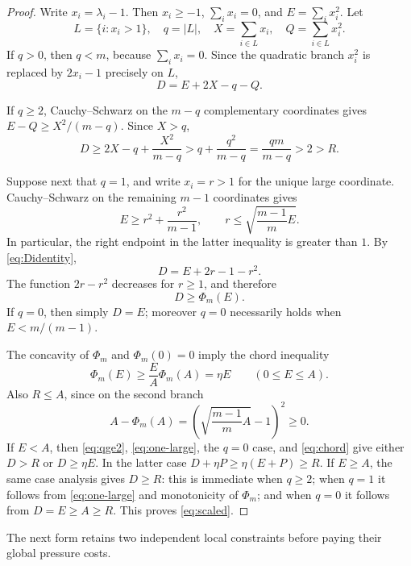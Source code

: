 \documentclass[11pt]{amsart}
\theoremstyle{remark}
\begin{document}
\begin{proof}
Write $x_i=\lambda_i-1$.  Then $x_i\ge-1$, $\sum_i x_i=0$, and
$E=\sum_i x_i^2$.  Let
\[
 L=\{i:x_i>1\},\quad q=|L|,
 \quad X=\sum_{i\in L}x_i,
 \quad Q=\sum_{i\in L}x_i^2.
\]
If $q>0$, then $q<m$, because $\sum_i x_i=0$.
Since the quadratic branch $x_i^2$ is replaced by $2x_i-1$ precisely on
$L$,
\begin{equation}\label{eq:Didentity}
 D=E+2X-q-Q.
\end{equation}

If $q\ge2$, Cauchy--Schwarz on the $m-q$ complementary coordinates gives
$E-Q\ge X^2/(m-q)$.  Since $X>q$,
\begin{equation}\label{eq:qge2}
 D\ge2X-q+\frac{X^2}{m-q}
 >q+\frac{q^2}{m-q}=\frac{qm}{m-q}>2>R.
\end{equation}

Suppose next that $q=1$, and write $x_i=r>1$ for the unique large
coordinate.  Cauchy--Schwarz on the remaining $m-1$ coordinates gives
\[
 E\ge r^2+\frac{r^2}{m-1},
 \qquad
 r\le\sqrt{\frac{m-1}{m}E}.
\]
In particular, the right endpoint in the latter inequality is greater than
$1$.
By \eqref{eq:Didentity},
\[
 D=E+2r-1-r^2.
\]
The function $2r-r^2$ decreases for $r\ge1$, and therefore
\begin{equation}\label{eq:one-large}
 D\ge\Phi_m(E).
\end{equation}
If $q=0$, then simply $D=E$; moreover $q=0$ necessarily holds when
$E<m/(m-1)$.

The concavity of $\Phi_m$ and $\Phi_m(0)=0$ imply the chord inequality
\begin{equation}\label{eq:chord}
 \Phi_m(E)\ge\frac EA\Phi_m(A)=\eta E
 \qquad(0\le E\le A).
\end{equation}
Also $R\le A$, since on the second branch
\[
 A-\Phi_m(A)
 =\left(\sqrt{\frac{m-1}{m}A}-1\right)^2\ge0.
\]
If $E<A$, then \eqref{eq:qge2}, \eqref{eq:one-large}, the $q=0$ case, and
\eqref{eq:chord} give either $D>R$ or $D\ge\eta E$.  In the latter case
$D+\eta P\ge\eta(E+P)\ge R$.  If $E\ge A$, the same case analysis gives
$D\ge R$: this is immediate when $q\ge2$; when $q=1$ it follows from
\eqref{eq:one-large} and monotonicity of $\Phi_m$; and when $q=0$ it follows
from $D=E\ge A\ge R$.  This proves \eqref{eq:scaled}.
\end{proof}

The next form retains two independent local constraints before paying their
global pressure costs.
\end{document}

